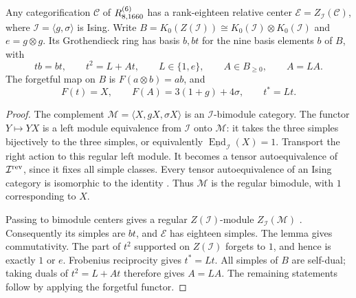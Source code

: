 \begin{proposition}\label{prop:1660-relative-center}
Any categorification $\mathcal C$ of $R^{(6)}_{8,1660}$ has a rank-eighteen
relative center $\mathcal E=Z_{\mathcal I}(\mathcal C)$, where
$\mathcal I=\langle g,\sigma\rangle$ is Ising. Write
$B=K_0(Z(\mathcal I))\cong K_0(\mathcal I)\otimes K_0(\mathcal I)$ and
$e=g\otimes g$. Its Grothendieck ring has basis $b,bt$ for the nine
basis elements $b$ of $B$, with
\[
 tb=bt,\qquad t^2=L+At,\qquad L\in\{1,e\},\qquad A\in B_{\ge0},
 \qquad A=LA.
\]
The forgetful map on $B$ is $F(a\otimes b)=ab$, and
\[
 F(t)=X,\qquad F(A)=3(1+g)+4\sigma,\qquad t^*=Lt.
\]
\end{proposition}
\begin{proof}
The complement $\mathcal M=\langle X,gX,\sigma X\rangle$ is an
$\mathcal I$-bimodule category. The functor $Y\mapsto YX$ is a left
module equivalence from $\mathcal I$ onto $\mathcal M$: it takes the
three simples bijectively to the three simples, or equivalently
$\underline{\operatorname{End}}_{\mathcal I}(X)=1$.
Transport the right action to this regular left module. It becomes a
tensor autoequivalence of $\mathcal I^{\rm rev}$, since it fixes all
simple classes. Every tensor autoequivalence of an Ising category is
isomorphic to the identity \cite[Remark B.6(i)]{DGNO}. Thus
$\mathcal M$ is the regular bimodule, with $1$ corresponding to $X$.

Passing to bimodule centers gives a regular $Z(\mathcal I)$-module
$Z_{\mathcal I}(\mathcal M)$ \cite[Definition 2.1 and Remark 2.2]{GNNrel}.
Consequently its simples are $bt$, and $\mathcal E$ has eighteen
simples. The lemma gives commutativity. The part of $t^2$ supported on
$Z(\mathcal I)$ forgets to $1$, and hence is exactly $1$ or $e$.
Frobenius reciprocity gives $t^*=Lt$. All simples of $B$ are self-dual;
taking duals of $t^2=L+At$ therefore gives $A=LA$. The remaining
statements follow by applying the forgetful functor.
\end{proof}

